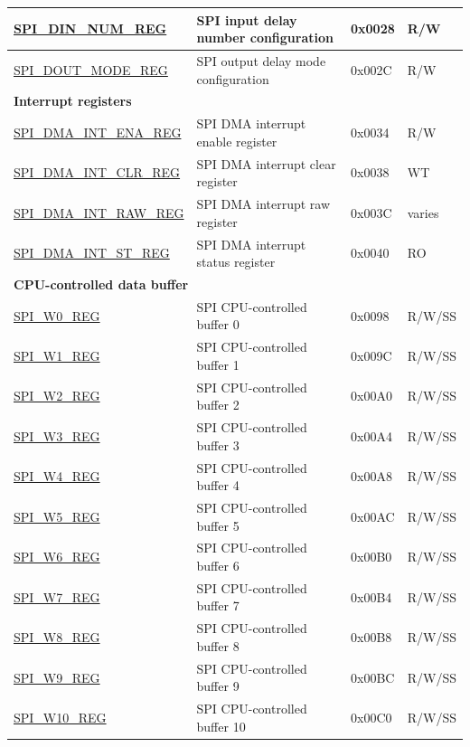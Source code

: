 \begin{longtable}{ | p{6cm} | p{7.2cm} | p{1.3cm} | p{1cm} | }
\hyperref[regdesc:SPIDINNUMREG]{SPI\_DIN\_NUM\_REG} & SPI input delay number configuration & 0x0028 & R/W \\ \hline
\hyperref[regdesc:SPIDOUTMODEREG]{SPI\_DOUT\_MODE\_REG} & SPI output delay mode configuration & 0x002C & R/W \\ \hline
\multicolumn{4}{|l|}{\textbf{Interrupt registers}} \\ \hline
\hyperref[regdesc:SPIDMAINTENAREG]{SPI\_DMA\_INT\_ENA\_REG} & SPI DMA interrupt enable register & 0x0034 & R/W \\ \hline
\hyperref[regdesc:SPIDMAINTCLRREG]{SPI\_DMA\_INT\_CLR\_REG} & SPI DMA interrupt clear register & 0x0038 & WT \\ \hline
\hyperref[regdesc:SPIDMAINTRAWREG]{SPI\_DMA\_INT\_RAW\_REG} & SPI DMA interrupt raw register & 0x003C & varies \\ \hline
\hyperref[regdesc:SPIDMAINTSTREG]{SPI\_DMA\_INT\_ST\_REG} & SPI DMA interrupt status register & 0x0040 & RO \\ \hline
\multicolumn{4}{|l|}{\textbf{CPU-controlled data buffer}} \\ \hline
\hyperref[regdesc:SPIW0REG]{SPI\_W0\_REG} & SPI CPU-controlled buffer 0 & 0x0098 & R/W/SS \\ \hline
\hyperref[regdesc:SPIW1REG]{SPI\_W1\_REG} & SPI CPU-controlled buffer 1 & 0x009C & R/W/SS \\ \hline
\hyperref[regdesc:SPIW2REG]{SPI\_W2\_REG} & SPI CPU-controlled buffer 2 & 0x00A0 & R/W/SS \\ \hline
\hyperref[regdesc:SPIW3REG]{SPI\_W3\_REG} & SPI CPU-controlled buffer 3 & 0x00A4 & R/W/SS \\ \hline
\hyperref[regdesc:SPIW4REG]{SPI\_W4\_REG} & SPI CPU-controlled buffer 4 & 0x00A8 & R/W/SS \\ \hline
\hyperref[regdesc:SPIW5REG]{SPI\_W5\_REG} & SPI CPU-controlled buffer 5 & 0x00AC & R/W/SS \\ \hline
\hyperref[regdesc:SPIW6REG]{SPI\_W6\_REG} & SPI CPU-controlled buffer 6 & 0x00B0 & R/W/SS \\ \hline
\hyperref[regdesc:SPIW7REG]{SPI\_W7\_REG} & SPI CPU-controlled buffer 7 & 0x00B4 & R/W/SS \\ \hline
\hyperref[regdesc:SPIW8REG]{SPI\_W8\_REG} & SPI CPU-controlled buffer 8 & 0x00B8 & R/W/SS \\ \hline
\hyperref[regdesc:SPIW9REG]{SPI\_W9\_REG} & SPI CPU-controlled buffer 9 & 0x00BC & R/W/SS \\ \hline
\hyperref[regdesc:SPIW10REG]{SPI\_W10\_REG} & SPI CPU-controlled buffer 10 & 0x00C0 & R/W/SS \\ \hline

\end{longtable}
